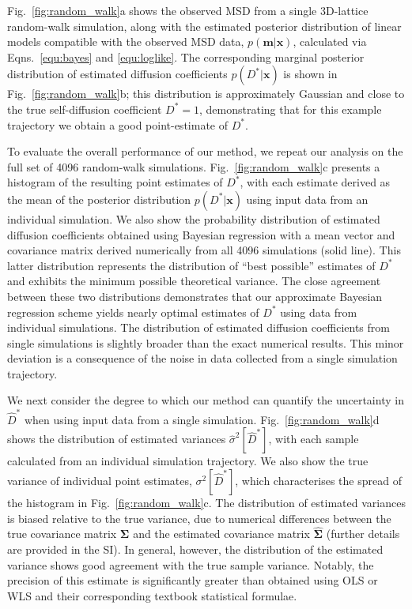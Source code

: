 \documentclass[reprint,superscriptaddress,nobibnotes,amsmath,amssymb,aps,prx,hidelinks,linenumbers]{revtex4-2}
\newcommand{\oMSD}{\ensuremath{\bm{x}}}
\newcommand{\model}{\bm{m}}
\newcommand{\prob}[1]{\ensuremath{p(#1)}}
\newcommand{\Dest}{\ensuremath{\widehat{D}^*}}
\newcommand{\D}{\ensuremath{D^*}}
\newcommand{\var}[1]{\ensuremath{\sigma^2[#1]}}
\newcommand{\varest}[1]{\ensuremath{\widehat{\sigma}^2[#1]}}
\begin{document}
Fig.~\ref{fig:random_walk}a shows the observed MSD from a single 3D-lattice random-walk simulation, along with the estimated posterior distribution of linear models compatible with the observed MSD data, $\prob{\model|\oMSD}$, calculated via Eqns.~\ref{equ:bayes} and \ref{equ:loglike}.
The corresponding marginal posterior distribution of estimated diffusion coefficients $\prob{\D|\oMSD}$ is shown in Fig.~\ref{fig:random_walk}b; this distribution is approximately Gaussian and close to the true self-diffusion coefficient $\D = \num{1}$, demonstrating that for this example trajectory we obtain a good point-estimate of $\D$.

To evaluate the overall performance of our method, we repeat our analysis on the full set of \num{4096} random-walk simulations.
Fig.~\ref{fig:random_walk}c presents a histogram of the resulting point estimates of $\D$, with each estimate derived as the mean of the posterior distribution $\prob{\D|\oMSD}$ using input data from an individual simulation.
We also show the probability distribution of estimated diffusion coefficients obtained using Bayesian regression with a mean vector and covariance matrix derived numerically from all \num{4096} simulations (solid line).
This latter distribution represents the distribution of ``best possible'' estimates of $\D$ and exhibits the minimum possible theoretical variance.
The close agreement between these two distributions demonstrates that our approximate Bayesian regression scheme yields nearly optimal estimates of $\D$ using data from individual simulations.
The distribution of estimated diffusion coefficients from single simulations is slightly broader than the exact numerical results.
This minor deviation is a consequence of the noise in data collected from a single simulation trajectory.

We next consider the degree to which our method can quantify the uncertainty in $\Dest$ when using input data from a single simulation.
Fig.~\ref{fig:random_walk}d shows the distribution of estimated variances $\varest{\Dest}$, with each sample calculated from an individual simulation trajectory.
We also show the true variance of individual point estimates, $\var{\Dest}$, which characterises the spread of the histogram in Fig.~\ref{fig:random_walk}c.
The distribution of estimated variances is biased relative to the true variance, due to numerical differences between the true covariance matrix $\mathbf{\Sigma}$ and the estimated covariance matrix $\widehat{\mathbf{\Sigma}}$ (further details are provided in the SI).
In general, however, the distribution of the estimated variance shows good agreement with the true sample variance.
Notably, the precision of this estimate is significantly greater than obtained using OLS or WLS and their corresponding textbook statistical formulae.
\end{document}
